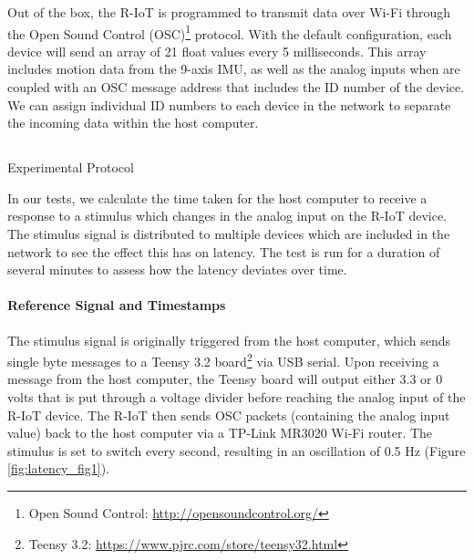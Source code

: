 Out of the box, the R-IoT is programmed to transmit data over Wi-Fi through the Open Sound Control (OSC)\footnote{Open Sound Control: \url{http://opensoundcontrol.org/}} protocol. With the default configuration, each device will send an array of 21 float values every 5 milliseconds. This array includes motion data from the 9-axis IMU, as well as the analog inputs when are coupled with an OSC message address that includes the ID number of the device. We can assign individual ID numbers to each device in the network to separate the incoming data within the host computer.

\subsection{}{Experimental Protocol}

In our tests, we calculate the time taken for the host computer to receive a response to a stimulus which changes in the analog input on the R-IoT device. The stimulus signal is distributed to multiple devices which are included in the network to see the effect this has on latency. The test is run for a duration of several minutes to assess how the latency deviates over time.

\paragraph{Reference Signal and Timestamps}
The stimulus signal is originally triggered from the host computer, which sends single byte messages to a Teensy 3.2 board\footnote{Teensy 3.2: \url{https://www.pjrc.com/store/teensy32.html}} via USB serial. Upon receiving a message from the host computer, the Teensy board will output either 3.3 or 0 volts that is put through a voltage divider before reaching the analog input of the R-IoT device. The R-IoT then sends OSC packets (containing the analog input value) back to the host computer via a TP-Link MR3020 Wi-Fi router. The stimulus is set to switch every second, resulting in an oscillation of 0.5 Hz (Figure \ref{fig:latency_fig1}).

